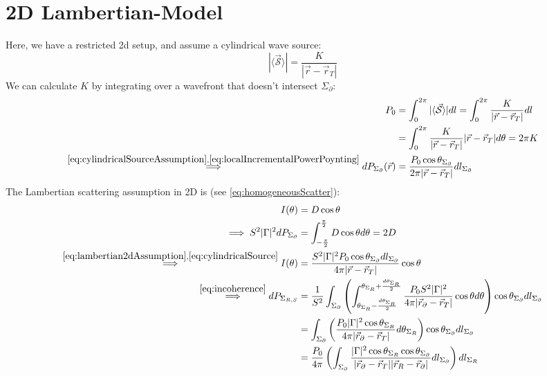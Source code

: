 \documentclass{article}
\begin{document}
\renewcommand{\thesection}{\arabic{section}}
\setcounter{section}{0}
\setcounter{equation}{0}
\section{2D Lambertian-Model}
Here, we have a restricted 2d setup, and assume a cylindrical wave source:
\begin{equation}
   | \langle \vec{\mathcal{S}} \rangle | = \frac{K}{|\vec{r} - \vec{r}_T|}
   \label{eq:cylindricalSourceAssumption}
\end{equation}
We can calculate $K$ by integrating over a wavefront that doesn't intersect
$\Sigma_{\partial}$:
\begin{align}
   P_0 &= \int_{0}^{2 \pi} | \langle \vec{\mathcal{S}} \rangle | dl = \int_0^{2 \pi}
      \frac{K}{|\vec{r} - \vec{r}_T|} dl \nonumber \\
   &= \int_0^{2 \pi} \frac{K}{|\vec{r} - \vec{r}_T|} |\vec{r} - \vec{r}_T| d \theta
      = 2 \pi K \nonumber \\ 
   \overset{\eqref{eq:cylindricalSourceAssumption},
      \eqref{eq:localIncrementalPowerPoynting}}{\implies} dP_{\Sigma_{\partial}} ( \vec{r} )
      &= \frac{P_0 \cos \theta_{\Sigma_{\partial}}}{2 \pi |\vec{r} - \vec{r}_T|}
      dl_{\Sigma_{\partial}} \label{eq:cylindricalSource}
\end{align}
The Lambertian scattering assumption in 2D is (see \eqref{eq:homogeneousScatter}):
\begin{align}
   I( \theta ) &= D \cos \theta  \label{eq:lambertian2dAssumption} \\
   \implies S^2 | \Gamma |^2 dP_{\Sigma_{\partial}} &=
      \int_{-\frac{\pi}{2}}^{\frac{\pi}{2}} D \cos \theta d \theta = 2D \nonumber \\
   \overset{\eqref{eq:lambertian2dAssumption}
      ,\eqref{eq:cylindricalSource}}{\implies} I( \theta ) &= \frac{S^2 |\Gamma|^2
      P_0 \cos \theta_{\Sigma_{\partial}} dl_{\Sigma_{\partial}}}{4 \pi |\vec{r} -
      \vec{r}_T|} \cos \theta \nonumber \\
   \overset{\eqref{eq:incoherence}}{\implies} dP_{\Sigma_{R, S}} &=
      \frac{1}{S^2} \int_{\Sigma_\partial} \left( \int_{\theta_{\Sigma_{R}}- \frac{d
      \theta_{\Sigma_{R}}}{2} }^{\theta_{\Sigma_{R}} + \frac{d
      \theta_{\Sigma_{R}}}{2} } \frac{P_0 S^2 |\Gamma|^2 }{4 \pi |\vec{r}_{\partial}
      - \vec{r}_T| } \cos \theta d \theta \right) \cos \theta_{\Sigma_{\partial}}
      dl_{\Sigma_{\partial}} \nonumber \\
   &= \int_{\Sigma_\partial} \left( \frac{P_0 |\Gamma|^2 \cos
      \theta_{\Sigma_{R}}}{4 \pi |\vec{r}_{\partial} - \vec{r}_T| } d
      \theta_{\Sigma_{R}} \right) \cos \theta_{\Sigma_{\partial}} dl_{\Sigma_{\partial}} \nonumber \\
   &= \frac{P_0}{4 \pi} \left( \int_{\Sigma_\partial} \frac{|\Gamma|^2 \cos
   \theta_{\Sigma_{R}} \cos \theta_{\Sigma_{\partial}} }{|\vec{r}_{\partial}
   - \vec{r}_T||\vec{r}_{R} - \vec{r}_{\partial}|} dl_{\Sigma_{\partial}} \right)
   dl_{\Sigma_R} 
\end{align}
\end{document}
